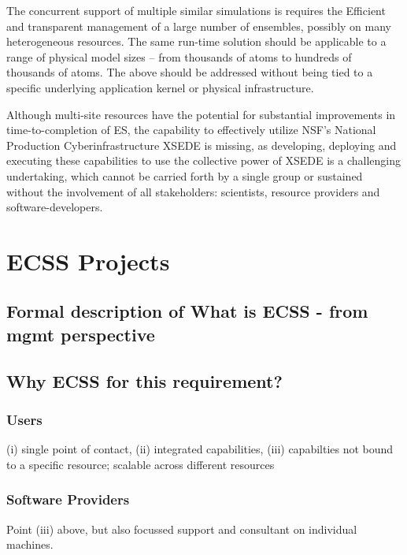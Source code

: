 \documentclass{sig-alternate}
\begin{document}
The concurrent support of multiple similar simulations is requires the
Efficient and transparent management of a large number of ensembles,
possibly on many heterogeneous resources. The same run-time solution
should be applicable to a range of physical model sizes -- from
thousands of atoms to hundreds of thousands of atoms.%
The above should be addressed without being tied to a specific
underlying application kernel or physical infrastructure. 
 
Although multi-site resources have the potential for substantial
improvements in time-to-completion of ES, the capability to
effectively utilize NSF's National Production Cyberinfrastructure
XSEDE is missing, as developing, deploying and executing these
capabilities to use the collective power of XSEDE is a challenging
undertaking, which cannot be carried forth by a single group or
sustained without the involvement of all stakeholders: scientists,
resource providers and software-developers.

\section{ECSS Projects}

\subsection{Formal description of What is ECSS - from mgmt perspective}

\subsection{Why ECSS for this requirement?}


\subsubsection{Users} (i) single point of contact, (ii) integrated capabilities,
(iii) capabilties not bound to a specific resource; scalable across
different resources

\subsubsection{Software Providers} Point (iii) above, but also focussed support and
consultant on individual machines.
\end{document}
